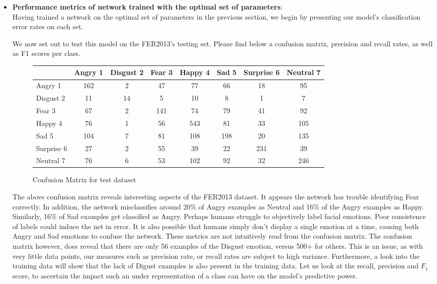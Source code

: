 \begin{itemize}[topsep=-10pt]
  
\item \textbf{Performance metrics of network trained with the optimal set of parameters}:\\
  Having trained a network on the optimal set of parameters in the previous section,
  we begin by presenting our model's classification error rates on each set.
  
  We now set out to test this model on the FER2013's testing set.
  Please find below a confusion matrix, precision and recall rates, as well as F1 scores per class.
  \begin{figure}[h]
  \begin{center}
    \caption{Confusion Matrix for test dataset}
    \begin{tabular}{ | l || c | c | c | c | c | c | c |}
    \hline
          & Angry 1 & Disgust 2 & Fear 3 & Happy 4 & Sad 5 & Surprise 6 & Neutral 7 \\ \hline \hline
        Angry 1 & 162 & 2 & 47 & 77 & 66 & 18 & 95 \\ \hline
        Disgust 2 & 11 & 14 & 5 & 10 & 8 & 1 & 7 \\ \hline
        Fear 3 & 67 & 2 & 141 & 74 & 79 & 41 & 92 \\ \hline
        Happy 4 & 76 & 1 & 56 & 543 & 81 & 33 & 105 \\ \hline
        Sad 5 & 104 & 7 & 81 & 108 & 198 & 20 & 135 \\ \hline
        Surprise 6 & 27 & 2 & 55 & 39 & 22 & 231 & 39 \\ \hline
        Neutral 7 & 76 & 6 & 53 & 102 & 92 & 32 & 246 \\ \hline
    \end{tabular}
    \label{fig:confusionMatrix}
\end{center}
\end{figure}

  The above confusion matrix reveals interesting aspects of the FER2013 dataset.
  It appears the network has trouble identifying Fear correctly.
  In addition, the network misclassifies around 20\% of Angry examples as Neutral and 16\% of the Angry examples as Happy.
  Similarly, 16\% of Sad examples get classified as Angry.
  Perhaps humans struggle to objectively label facial emotions.
  Poor consistence of labels could induce the net in error.
  It is also possible that humans simply don't display a single emotion at a time,
  causing both Angry and Sad emotions to confuse the network.
  These metrics are not intuitively read from the confusion matrix.
  The confusion matrix however, does reveal that there are only 56 examples of the Disgust emotion, versus 500+ for others.
  This is an issue, as with very little data points, our measures such as precision rate, or recall rates are subject to high variance.
  Furthermore, a look into the training data will show that the lack of Digust examples is also present in the training data.
  Let us look at the recall, precision and $F_1$ score,
  to ascertain the impact such an under representation of a class can have on the model's predictive power.
  

\end{itemize}
